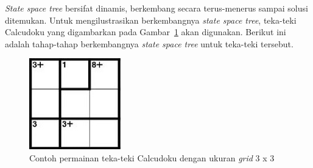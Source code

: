 \textit{State space tree} bersifat dinamis, berkembang secara terus-menerus sampai solusi ditemukan. Untuk mengilustrasikan berkembangnya \textit{state space tree}, teka-teki Calcudoku yang digambarkan pada Gambar~\ref{fig:backtracking4} akan digunakan. Berikut ini adalah tahap-tahap berkembangnya \textit{state space tree} untuk teka-teki tersebut.

\begin{figure}
\centering
\captionsetup{justification=centering}
\includegraphics[scale=0.75]{Gambar/Backtracking4}
\caption[Contoh permainan teka-teki Calcudoku dengan ukuran \textit{grid} 3 x 3 ~\cite{fahda:16:backtracking}]{Contoh permainan teka-teki Calcudoku dengan ukuran \textit{grid} 3 x 3 ~\cite{fahda:16:backtracking}}
\label{fig:backtracking4}
\end{figure}

